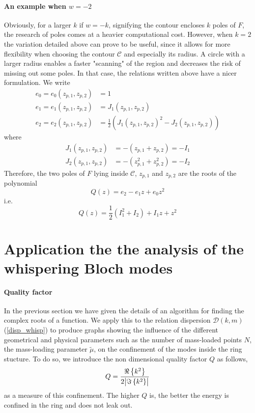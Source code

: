 \documentclass[11pt]{report}
\numberwithin{equation}{section}
\begin{document}
\paragraph{An example when $w=-2$} Obviously, for a larger $k$ if $w = -k$, signifying the contour encloses $k$ poles of $F$, the research of poles comes at a heavier computational cost. However, when $k=2$ the variation detailed above can prove to be useful, since it allows for more flexibility when choosing the contour $\mathcal{C}$ and especially its radius. A circle with a larger radius enables a faster "scanning" of the region and decreases the risk of missing out some poles. In that case, the relations written above have a nicer formulation. We write
%
\begin{align}
	e_0 = e_0(z_{p,1},z_{p,2}) &= 1\\
	e_1 = e_1(z_{p,1},z_{p,2}) &= J_1(z_{p,1},z_{p,2})\\
	e_2 = e_2(z_{p,1},z_{p,2}) &= \frac{1}{2}\left(J_1(z_{p,1},z_{p,2})^2 - J_2(z_{p,1},z_{p,2})\right)
\end{align}
%
where
%
\begin{align}
	J_1(z_{p,1},z_{p,2}) &= -(z_{p,1}+z_{p,2}) = -I_1 \\
	J_2(z_{p,1},z_{p,2}) &= -(z_{p,1}^2+z_{p,2}^2) = -I_2	
\end{align}
%
Therefore, the two poles of $F$ lying inside $\mathcal{C}$,  $z_{p,1}$ and $z_{p,2}$ are the roots of the polynomial
%
\begin{equation}
	Q(z) = e_2 - e_1 z + e_0 z^2 
\end{equation}
%
i.e.
%
\begin{equation}
	Q(z) = \frac{1}{2}(I_1^2 + I_2) + I_1 z + z^2
\end{equation}
%

\section{Application the the analysis of the whispering Bloch modes}

\paragraph{Quality factor}
In the previous section we have given the details of an algorithm for finding the complex roots of a function. We apply this to the relation dispersion $\mathcal{D}(k,m)$ (\ref{disp_whisp}) to produce graphs showing the influence of the different geometrical and physical parameters such as the number of mass-loaded points $N$, the mass-loading parameter $\tilde \mu$, on the confinement of the modes inside the ring stucture. To do so, we introduce the non dimensional quality factor $Q$ as follows,
%
\begin{equation}
	Q = \frac{\Re\left\{k^2\right\}}{2\abs{\Im\left\{k^2\right\}}}
\end{equation}
%
as a measure of this confinement. The higher $Q$ is, the better the energy is confined in the ring and does not leak out.
\end{document}
